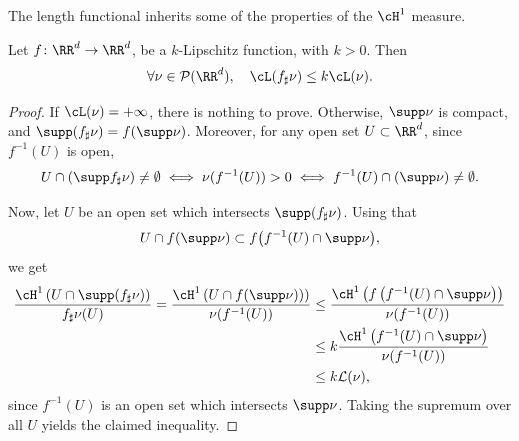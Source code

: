 The length functional inherits some of the properties of the $\cH^1$ measure.
\begin{proposition}\label{prop.length.lipschitz}
Let $f\colon \RR^d\rightarrow \RR^d$, be a $k$-Lipschitz function, with $k>0$. Then
\begin{equation}
\forall \nu \in \mathcal{P}(\RR^d),\quad \cL(f_\sharp\nu)\leq k \cL(\nu). \label{eq.lipschitzlength}
\end{equation}
\end{proposition}

\begin{proof}
If $\cL(\nu)=+\infty$, there is nothing to prove. Otherwise, $\supp \nu$ is compact, and $\supp(f_\sharp \nu)= f(\supp \nu)$.
Moreover, for any open set $U \subset \RR^d$, since $f^{-1}(U)$ is open,
\begin{equation*}
U\cap \left(\supp f_\sharp \nu\right)\neq \emptyset \iff \nu(f^{-1}(U))>0 \iff f^{-1}(U)\cap \left(\supp \nu\right)\neq \emptyset.
\end{equation*}

Now, let $U$ be an open set which intersects $\supp(f_\sharp \nu)$. Using that
\begin{equation*}
U\cap f(\supp \nu) \subset f\bigl(f^{-1}(U)\cap \supp \nu\bigr),
\end{equation*}
we get
\begin{align*}
\frac{\cH^1\left(U\cap \supp (f_\sharp \nu)\right)}{f_\sharp\nu(U)}= \frac{\cH^1\left(U\cap f(\supp \nu))\right)}{\nu(f^{-1}(U))}
&\leq \frac{\cH^1\left(f\left(f^{-1}(U)\cap \supp \nu\right)\right)}{\nu(f^{-1}(U))}\\
&\leq k\frac{\cH^1\left(f^{-1}(U)\cap \supp \nu\right)}{\nu(f^{-1}(U))}\\
&\leq k\mathcal{L}(\nu),
\end{align*}
since $f^{-1}(U)$ is an open set which intersects $\supp \nu$.
Taking the supremum over all $U$ yields the claimed inequality.
\end{proof}

